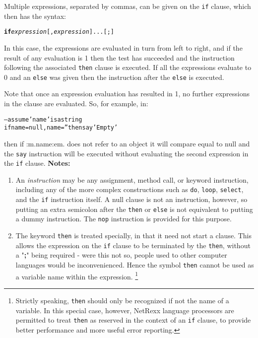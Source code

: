 Multiple expressions, separated by commas, can be given on the
\texttt{if} clause, which then has the syntax:
\begin{shaded}
\begin{alltt}
\textbf{if} \emph{expression}[, \emph{expression}]... [;]
\end{alltt}
\end{shaded}
In this case, the expressions are evaluated in turn from left to
right, and if the result of any evaluation is 1 then the test has
succeeded and the instruction following the associated \texttt{then}
clause is executed.
If all the expressions evaluate to 0 and an \texttt{else} was given
then the instruction after the \texttt{else} is executed.
 
Note that once an expression evaluation has resulted in 1, no further
expressions in the clause are evaluated.  So, for example, in:
\begin{alltt}
-- assume 'name' is a string
if name=null, name='' then say 'Empty'
\end{alltt}
then if :m.name:em. does not refer to an object it will compare equal to
null and the \texttt{say} instruction will be executed without
evaluating the second expression in the \texttt{if} clause.
 \textbf{Notes:}
\begin{enumerate}
\item An \emph{instruction} may be any assignment, method call, or
keyword instruction, including any of the more complex constructions
such as \texttt{do}, \texttt{loop}, \texttt{select}, and the \texttt{if}
instruction itself.
A null clause is not an instruction, however, so putting an extra
semicolon after the \texttt{then} or \texttt{else} is not equivalent to
putting a dummy instruction.
The \texttt{nop} instruction is provided for this purpose.
\item The keyword \texttt{then} is treated specially, in that it need not start a
clause.
This allows the expression on the \texttt{if} clause to be terminated by
the \texttt{then}, without a "\textbf{;}" being required -
were this not so, people used to other computer languages would
be inconvenienced.
Hence the symbol \texttt{then} cannot be used as a variable name within
the expression.
\footnote{
Strictly speaking, \texttt{then} should only be recognized if not
the name of a variable.  In this special case, however, NetRexx language
processors are permitted to treat \texttt{then} as reserved in the
context of an \texttt{if} clause, to provide better performance and
more useful error reporting.
}
\end{enumerate}
